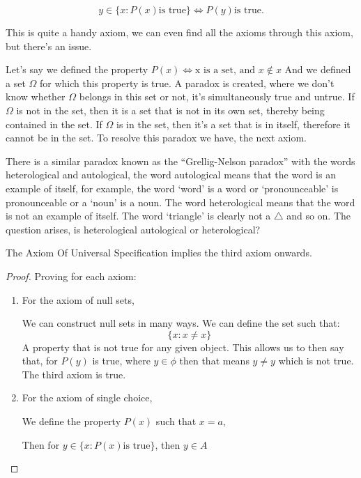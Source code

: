 \documentclass[11pt]{report}
\begin{document}
\begin{enumerate}
	      $$ y \in \{ x : P(x) \text{is true} \} \Leftrightarrow P(y) \text{is true.}$$

	      This is quite a handy axiom, we can even find all the axioms through this axiom, but there's an issue.

	      Let's say we defined the property $P(x) \Leftrightarrow \text{x is a set, and } x \notin x$
	      And we defined a set $\Omega$ for which this property is true.
	      A paradox is created, where we don't know whether $\Omega$ belongs in this set or not, it's simultaneously true and untrue. If $\Omega$ is not in the set, then it is a set that is not in its own set, thereby being contained in the set. If $\Omega$ is in the set, then it's a set that is in itself, therefore it cannot be in the set.
	      To resolve this paradox we have, the next axiom.
	      \begin{note}
		      There is a similar paradox known as the ``Grellig-Nelson paradox'' with the words heterological and autological, the word autological means that the word is an example of itself, for example, the word `word' is a word or `pronounceable' is pronounceable or a `noun' is a noun. The word heterological means that the word is not an example of itself. The word `triangle' is clearly not a $\triangle$ and so on. The question arises, is heterological autological or heterological?
	      \end{note}
	      \begin{prop}
		      The Axiom Of Universal Specification implies the third axiom onwards.
	      \end{prop}
	      \begin{proof}
		      Proving for each axiom:
		      \begin{enumerate}
			      \item  For the axiom of null sets,

			            We can construct null sets in many ways.
			            We can define the set such that:
			            \[
				            \{ x : x \ne x \}
			            \]
			            A property that is not true for any given object. This allows us to then say that, for $P(y)$ is true, where $y \in \phi$ then that means $y \neq y$ which is not true. The third axiom is true.

			      \item      For the axiom of single choice,

			            We define the property $P(x)$ such that $x = a$,

			            Then for $y \in \{x : P(x) \text{is true}\}$, then $y \in A$


\end{enumerate}
\end{proof}
\end{enumerate}
\end{document}

